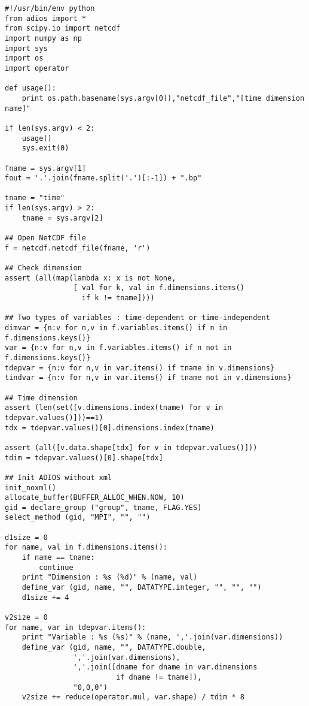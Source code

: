 \begin{lstlisting}[language=ADIOS-python,caption={ncdf2bp.py. An example Python/Numpy wrapper code for converting a NetCDF file to a ADIOS BP file},label={},]
#!/usr/bin/env python
from adios import *
from scipy.io import netcdf
import numpy as np
import sys
import os
import operator

def usage():
    print os.path.basename(sys.argv[0]),"netcdf_file","[time dimension name]"

if len(sys.argv) < 2:
    usage()
    sys.exit(0)

fname = sys.argv[1]
fout = '.'.join(fname.split('.')[:-1]) + ".bp"

tname = "time"
if len(sys.argv) > 2:
    tname = sys.argv[2]

## Open NetCDF file
f = netcdf.netcdf_file(fname, 'r')

## Check dimension
assert (all(map(lambda x: x is not None,
                [ val for k, val in f.dimensions.items()
                  if k != tname])))

## Two types of variables : time-dependent or time-independent
dimvar = {n:v for n,v in f.variables.items() if n in f.dimensions.keys()}
var = {n:v for n,v in f.variables.items() if n not in f.dimensions.keys()}
tdepvar = {n:v for n,v in var.items() if tname in v.dimensions}
tindvar = {n:v for n,v in var.items() if tname not in v.dimensions}

## Time dimension
assert (len(set([v.dimensions.index(tname) for v in tdepvar.values()]))==1)
tdx = tdepvar.values()[0].dimensions.index(tname)

assert (all([v.data.shape[tdx] for v in tdepvar.values()]))
tdim = tdepvar.values()[0].shape[tdx]

## Init ADIOS without xml
init_noxml()
allocate_buffer(BUFFER_ALLOC_WHEN.NOW, 10)
gid = declare_group ("group", tname, FLAG.YES)
select_method (gid, "MPI", "", "")

d1size = 0
for name, val in f.dimensions.items():
    if name == tname:
        continue
    print "Dimension : %s (%d)" % (name, val)
    define_var (gid, name, "", DATATYPE.integer, "", "", "")
    d1size += 4
    
v2size = 0
for name, var in tdepvar.items():
    print "Variable : %s (%s)" % (name, ','.join(var.dimensions))
    define_var (gid, name, "", DATATYPE.double,
                ','.join(var.dimensions),
                ','.join([dname for dname in var.dimensions
                          if dname != tname]),
                "0,0,0")
    v2size += reduce(operator.mul, var.shape) / tdim * 8


\end{lstlisting}
